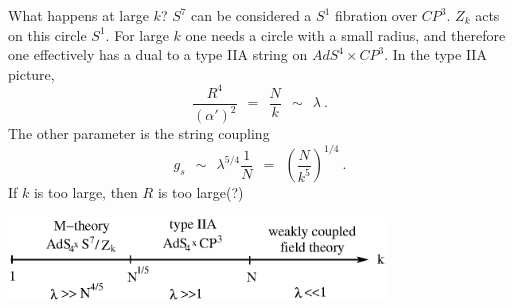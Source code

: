 \documentclass[12pt]{article}
\begin{document}
What happens at large $ k $?
$ S^7 $ can be considered a $ S^1 $ fibration over $ CP^3 $. 
$ Z_k $ acts on this circle $ S^1 $.
For large $ k $ one needs a circle with a small radius, and therefore one effectively has a dual to a type IIA string on
$ AdS^4 \times CP^3 $.
In the type IIA picture,
\[
	\frac{R^4}{(\alpha')^2} ~~=~~ \frac{N}{k} ~~\sim~~ \lambda~.
\]
The other parameter is the string coupling
\[
	g_s ~~\sim~~ \lambda^{5/4} \frac{1}{N} ~~=~~ \left( \frac{N}{k^5} \right)^{1/4}~.
\]
If $ k $ is too large, then $ R $ is too large(?)
\begin{center}
\includegraphics[width=10.0cm]{lambda.eps}
\end{center}
\end{document}
